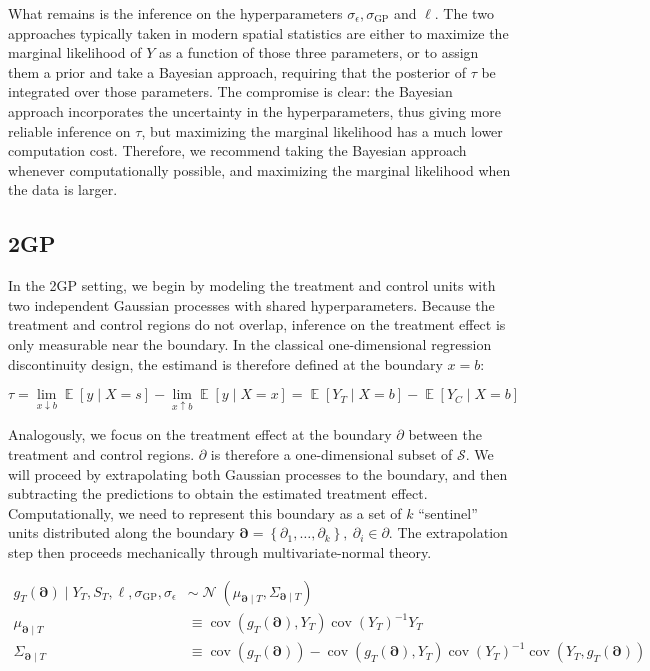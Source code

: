 \documentclass[letter]{article}
\newcommand{\genericdel}[3]{%
      \left#1#3\right#2
    }
\newcommand{\del}[1]{\genericdel(){#1}}
\newcommand{\sbr}[1]{\genericdel[]{#1}}
\newcommand{\cbr}[1]{\genericdel\{\}{#1}}
\DeclareMathOperator{\E}{\mathbb{E}}
\DeclareMathOperator{\cov}{{cov}}
\DeclareMathOperator{\normal}{\mathcal{N}}
\newcommand{\scrS}{\mathscr{S}}
\newcommand{\sigmaf}{\sigma_{\mathrm{GP}}}
\newcommand{\sigman}{\sigma_{\epsilon}}
\newcommand{\boundary}{\partial}
\newcommand{\sentinels}{\bm{\boundary}}
\begin{document}
What remains is the inference on the hyperparameters
\(\sigman, \sigmaf\) and \(\ell\). The two approaches typically taken in
modern spatial statistics are either to maximize the marginal likelihood
of \(Y\) as a function of those three parameters, or to assign them a
prior and take a Bayesian approach, requiring that the posterior of
\(\tau\) be integrated over those parameters. The compromise is clear:
the Bayesian approach incorporates the uncertainty in the
hyperparameters, thus giving more reliable inference on \(\tau\), but
maximizing the marginal likelihood has a much lower computation cost.
Therefore, we recommend taking the Bayesian approach whenever
computationally possible, and maximizing the marginal likelihood when
the data is larger.
    


    	\subsection{2GP}\label{gp}

In the 2GP setting, we begin by modeling the treatment and control units
with two independent Gaussian processes with shared hyperparameters.
Because the treatment and control regions do not overlap, inference on
the treatment effect is only measurable near the boundary. In the
classical one-dimensional regression discontinuity design, the estimand
is therefore defined at the boundary \(x=b\):

\begin{equation}
\tau = \lim_{x \downarrow b} \E\sbr{y \mid X=s} - \lim_{x \uparrow b} \E\sbr{y \mid X=x} = \E\sbr{Y_T \mid X=b} - \E\sbr{Y_C \mid X=b}
\end{equation}

Analogously, we focus on the treatment effect at the boundary
\(\boundary\) between the treatment and control regions. \(\boundary\)
is therefore a one-dimensional subset of \(\scrS\). We will proceed by
extrapolating both Gaussian processes to the boundary, and then
subtracting the predictions to obtain the estimated treatment effect.
Computationally, we need to represent this boundary as a set of \(k\)
``sentinel'' units distributed along the boundary
\(\sentinels=\cbr{\boundary_1,\ldots,\boundary_k},~\partial_i \in \partial\).
The extrapolation step then proceeds mechanically through
multivariate-normal theory.

\begin{align}
    g_T(\sentinels) \mid Y_T, S_T, \ell, \sigmaf, \sigman &\sim \normal\del{\mu_{\sentinels \mid T}, \Sigma_{\sentinels \mid T}} \\
    \mu_{\sentinels \mid T} &\equiv \cov\del{g_T(\sentinels), Y_T} \cov\del{Y_T}^{-1}  Y_T \\
    \Sigma_{\sentinels \mid T} &\equiv \cov \del{g_T(\sentinels)} - \cov\del{g_T(\sentinels), Y_T} \cov\del{Y_T}^{-1} \cov\del{Y_T,g_T(\sentinels) \label{eq:postvarT2gp}
    }
\end{align}
\end{document}
